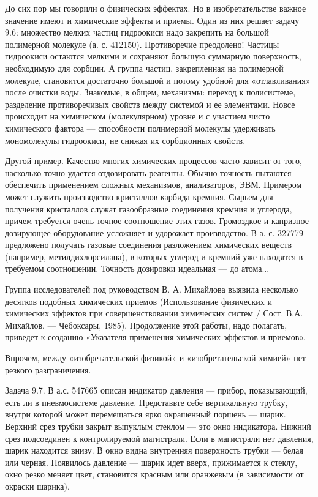 До сих  пор мы говорили  о физических эффектах. Но  в изобретательстве
важное  значение  имеют  и  химические   эффекты  и  приемы.  Один  из
них  решает  задачу  9.6:  множество  мелких  частиц  гидроокиси  надо
закрепить на большой полимерной  молекуле (а. с. 412150). Противоречие
преодолено! Частицы  гидроокиси остаются  мелкими и  сохраняют большую
суммарную  поверхность,  необходимую  для сорбции.  А  группа  частиц,
закрепленная на  полимерной молекуле, становится достаточно  большой и
потому  удобной для  «отлавливания»  после очистки  воды. Знакомые,  в
общем,  механизмы: переход  к  полисистеме, разделение  противоречивых
свойств между системой и ее элементами. Новсе происходит на химическом
(молекулярном)  уровне  и  с  участием  чисто  химического  фактора  —
способности полимерной молекулы удерживать мономолекулы гидроокиси, не
снижая их сорбционных свойств.

Другой пример.  Качество многих химических процессов  часто зависит от
того, насколько  точно удается отдозировать реагенты.  Обычно точность
пытаются обеспечить применением сложных механизмов, анализаторов, ЭВМ.
Примером может служить производство кристаллов карбида кремния. Сырьем
для  получения кристаллов  служат  газообразные  соединения кремния  и
углерода,  причем  требуется  очень  точное  соотношение  этих  газов.
Громоздкое и  капризное дозирующее оборудование усложняет  и удорожает
производство. В  а. с.  327779 предложено получать  газовые соединения
разложением  химических   веществ  (например,   метилдихлорсилана),  в
которых  углерод  и кремний  уже  находятся  в требуемом  соотношении.
Точность дозировки идеальная — до атома...

Группа  исследователей  под  руководством   В.  А.  Михайлова  выявила
несколько   десятков   подобных  химических   приемов   (Использование
физических  и  химических  эффектов при  совершенствовании  химических
систем /  Сост. В.А.  Михайлов. —  Чебоксары, 1985).  Продолжение этой
работы,  надо  полагать,  приведет к  созданию  «Указателя  применения
химических эффектов и приемов».


Впрочем, между «изобретательской  физикой» и «изобретательской химией»
нет резкого разграничения.

Задача  9.7.  В  а.с.  547665  описан  индикатор  давления  —  прибор,
показывающий,  есть  ли  в пневмосистеме  давление.  Представьте  себе
вертикальную трубку, внутри которой может перемещаться ярко окрашенный
поршень —  шарик. Верхний  срез трубки закрыт  выпуклым стеклом  — это
окно индикатора. Нижний срез  подсоединен к контролируемой магистрали.
Если в  магистрали нет давления,  шарик находится внизу. В  окно видна
внутренняя поверхность трубки — белая или черная. Появилось давление —
шарик  идет  вверх, прижимается  к  стеклу,  окно резко  меняет  цвет,
становится красным или оранжевым (в зависимости от окраски шарика).

